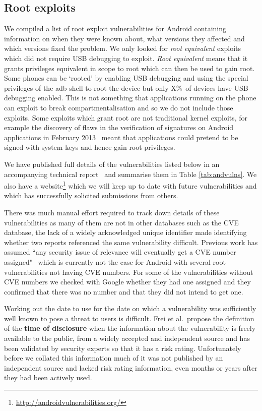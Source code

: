 \documentclass[conference,a4paper,twoside]{IEEEtran}
\newcommand{\daAdbPerc}{X\%}
\begin{document}
\subsection{Root exploits}
We compiled a list of root exploit vulnerabilities for Android containing information on when they were known about, what versions they affected and which versions fixed the problem.
We only looked for \emph{root equivalent} exploits which did not require USB debugging to exploit.
\emph{Root equivalent} means that it grants privileges equivalent in scope to root which can then be used to gain root.
Some phones can be `rooted' by enabling USB debugging and using the special privileges of the adb shell to root the device but only \daAdbPerc\ of devices have USB debugging enabled.
This is not something that applications running on the phone can exploit to break compartmentalisation and so we do not include those exploits.
Some exploits which grant root are not traditional kernel exploits, for example the discovery of flaws in the verification of signatures on Android applications in February 2013~\cite{Forristal2013} meant that applications could pretend to be signed with system keys and hence gain root privileges.

We have published full details of the vulnerabilities listed below in an accompanying technical report~\cite{TODO} and summarise them in Table \ref{tab:andvulns}.
We also have a website\footnote{\url{http://androidvulnerabilities.org/}} which we will keep up to date with future vulnerabilities and which has successfully solicited submissions from others.

There was much manual effort required to track down details of these vulnerabilities as many of them are not in other databases such as the CVE database, the lack of a widely acknowledged unique identifier made identifying whether two reports referenced the same vulnerability difficult.
Previous work has assumed ``any security issue of relevance will eventually get a CVE number assigned"~\cite{Frei2010} which is currently not the case for Android with several root vulnerabilities not having CVE numbers.
For some of the vulnerabilities without CVE numbers we checked with Google whether they had one assigned and they confirmed that there was no number and that they did not intend to get one.

Working out the date to use for the date on which a vulnerability was sufficiently well known to pose a threat to users is difficult.
Frei et al.\ propose the definition of the {\bf time of disclosure} when the information about the vulnerability is freely available to the public, from a widely accepted and independent source and has been validated by security experts so that it has a risk rating.
Unfortunately before we collated this information much of it was not published by an independent source and lacked risk rating information, even months or years after they had been actively used.
\end{document}
